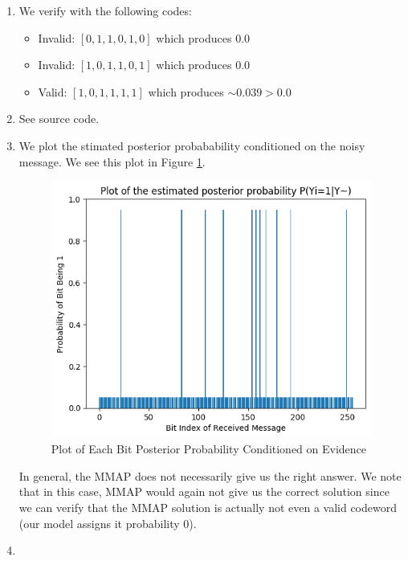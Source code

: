\documentclass[12pt]{article}
\begin{document}
\begin{enumerate}[label=(\alph*)]
\item We verify with the following codes:
	\begin{itemize}
		\item Invalid: $[0, 1, 1, 0, 1, 0]$ which produces $0.0$
    \item Invalid: $[1, 0, 1, 1, 0, 1]$ which produces $0.0$
    \item Valid: $[1, 0, 1, 1, 1, 1]$ which produces $\sim0.039 > 0.0$
	\end{itemize}
\item See source code.
\item We plot the stimated posterior probabability conditioned on the noisy message. We see this plot in Figure \ref{fig:conditional_probability_message}.

\begin{figure}[!h]
\centering
\includegraphics{programming/5c}
\caption{Plot of Each Bit Posterior Probability Conditioned on Evidence}
\label{fig:conditional_probability_message}
\end{figure}

In general, the MMAP does not necessarily give us the right answer. We note that in this case, MMAP would again not give us the correct solution since we can verify that the MMAP solution is actually not even a valid codeword (our model assigns it probability $0$).

\item 
\end{enumerate}
\end{document}
